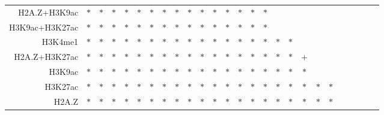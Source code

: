 \documentclass{bioinfo}
\begin{document}
\begin{table}[t]
\begin{center}
\begin{tabular}{ rccccccccccccccccccccccccc }
    H2A.Z+H3K9ac & $*$ & $*$ & $*$ & $*$ & $*$ & $*$ & $*$ & $*$ & $*$ & $*$ & $*$ & $*$ & $*$ & $*$ & $*$ &     &     &     &     &     &     &     &     &     &     \\
    H3K9ac+H3K27ac & $*$ & $*$ & $*$ & $*$ & $*$ & $*$ & $*$ & $*$ & $*$ & $*$ & $*$ & $*$ & $*$ & $*$ & $*$ &     &     &     &     &     &     &     &     &     &     \\
    H3K4me1 & $*$ & $*$ & $*$ & $*$ & $*$ & $*$ & $*$ & $*$ & $*$ & $*$ & $*$ & $*$ & $*$ & $*$ & $*$ & $*$ & $*$ &     &     &     &     &     &     &     &     \\
    H2A.Z+H3K27ac & $*$ & $*$ & $*$ & $*$ & $*$ & $*$ & $*$ & $*$ & $*$ & $*$ & $*$ & $*$ & $*$ & $*$ & $*$ & $*$ & $*$ & $+$ &     &     &     &     &     &     &     \\
    H3K9ac & $*$ & $*$ & $*$ & $*$ & $*$ & $*$ & $*$ & $*$ & $*$ & $*$ & $*$ & $*$ & $*$ & $*$ & $*$ & $*$ & $*$ & $*$ &     &     &     &     &     &     &     \\
    H3K27ac & $*$ & $*$ & $*$ & $*$ & $*$ & $*$ & $*$ & $*$ & $*$ & $*$ & $*$ & $*$ & $*$ & $*$ & $*$ & $*$ & $*$ & $*$ & $*$ & $*$ &     &     &     &     &     \\
    H2A.Z & $*$ & $*$ & $*$ & $*$ & $*$ & $*$ & $*$ & $*$ & $*$ & $*$ & $*$ & $*$ & $*$ & $*$ & $*$ & $*$ & $*$ & $*$ & $*$ & $*$ &     &     &     &     &     \\
    \hline
  \end{tabular}
\end{center}
\vspace{0.0cm}
\end{table}

\end{document}
